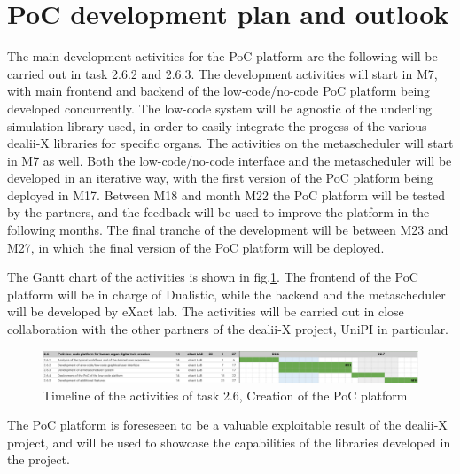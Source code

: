 \documentclass[a4paper,12pt]{article}
\begin{document}
\section{\textcolor{EUblue}{PoC development plan and outlook}}

The main development activities for the PoC platform are the following will be carried out in task 2.6.2 and 2.6.3. The development activities will start in M7, with main frontend and backend of the low-code/no-code PoC platform being developed concurrently. The low-code system will be agnostic of the underling simulation library used, in order to easily integrate the progess of the various dealii-X libraries for specific organs. The activities on the metascheduler will start in M7 as well. Both the low-code/no-code interface and the metascheduler will be developed in an iterative way, with the first version of the PoC platform being deployed in M17. Between M18 and month M22 the PoC platform will be tested by the partners, and the feedback will be used to improve the platform in the following months. The final tranche of the development will be between M23 and M27, in which the final version of the PoC platform will be deployed.

The Gantt chart of the activities is shown in fig.\ref{gannt}. The frontend of the PoC platform will be in charge of Dualistic, while the backend and the metascheduler will be developed by eXact lab. The activities will be carried out in close collaboration with the other partners of the dealii-X project, UniPI in particular. 
\begin{figure}
    \label{gannt}
    \includegraphics[width=400pt]{gantt.png}
    \caption{Timeline of the activities of task 2.6, Creation of the PoC platform}
\end{figure}
The PoC platform is foreseseen to be a valuable exploitable result of the dealii-X project, and will be used to showcase the capabilities of the libraries developed in the project.

\label{MyLastPage}
\end{document}
